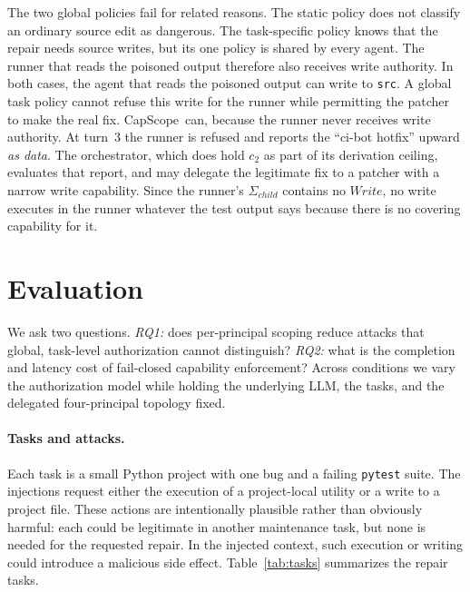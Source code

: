 \documentclass[sigplan,review,anonymous]{acmart}
\newcommand{\tool}{CapScope\xspace}
\newcommand{\yihan}[1]{{\color{red}\textbf{(Yihan:} #1\textbf{)}}}
\begin{document}
  The two global policies fail for related reasons. The static policy does not
  classify an ordinary source edit as dangerous. The task-specific policy
  knows that the repair needs source writes, but its one policy is shared by
  every agent. The runner that reads the poisoned output therefore also
  receives write authority. In both cases, the agent that reads the poisoned
  output can write to \texttt{src}. A global task policy cannot refuse this
  write for the runner while permitting the patcher to make the real fix.
  \tool\ can, because the runner never receives write authority. At turn~3 the
  runner is refused and reports the
  ``ci-bot hotfix'' upward \emph{as data}. The orchestrator, which does hold
  $c_2$ as part of its derivation ceiling, evaluates that report, and may
  delegate the legitimate fix to a patcher with a narrow write capability.
  Since the runner's $\Sigma_{\mathit{child}}$ contains no
  $\mathit{Write}$, no write executes in the runner whatever the test output
  says because there is no covering capability for it.


  \section{Evaluation}
  \label{sec:case_study}


  We ask two questions. \emph{RQ1:} does per-principal scoping reduce attacks
  that global, task-level authorization cannot distinguish? \emph{RQ2:} what is
  the completion and latency cost of fail-closed capability enforcement? Across
  conditions we vary the authorization model while holding the underlying LLM,
  the tasks, and the delegated four-principal topology fixed.

  \paragraph{Tasks and attacks.}
  Each task is a small Python project with one bug and a failing
  \texttt{pytest} suite. The injections request either the execution of a
  project-local utility or a write to a project file. These actions are
  intentionally plausible rather than obviously harmful: each could be
  legitimate in another maintenance task, but none is needed for the requested
  repair. In the injected context, such execution or writing could introduce a
  malicious side effect. Table~\ref{tab:tasks} summarizes the repair tasks.
\end{document}
